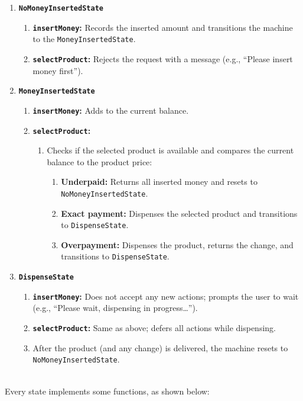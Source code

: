\begin{enumerate}
\item
\protect{}\label{5PvAVXmX5jSML7EurrMjR}
\textbf{\texttt{NoMoneyInsertedState}}

\begin{enumerate}
\item
\textbf{\texttt{insertMoney}:} Records the inserted amount and transitions the machine to the \texttt{MoneyInsertedState}.
\item
\textbf{\texttt{selectProduct}:} Rejects the request with a message (e.g., ``Please insert money first'').
\end{enumerate}
\item
\protect{}\label{r1dhO9ZqJTEp8kVgfl4t2}
\textbf{\texttt{MoneyInsertedState}}

\begin{enumerate}
\item
\textbf{\texttt{insertMoney}:} Adds to the current balance.
\item
\textbf{\texttt{selectProduct}:}

\begin{enumerate}
\item
Checks if the selected product is available and compares the current balance to the product price:

\begin{enumerate}
\item
\textbf{Underpaid:} Returns all inserted money and resets to \texttt{NoMoneyInsertedState}.
\item
\textbf{Exact payment:} Dispenses the selected product and transitions to \texttt{DispenseState}.
\item
\textbf{Overpayment:} Dispenses the product, returns the change, and transitions to \texttt{DispenseState}.
\end{enumerate}
\end{enumerate}
\end{enumerate}
\item
\protect{}\label{qmxNb4aKE3xbjWXRLcNYe}
\textbf{\texttt{DispenseState}}

\begin{enumerate}
\item
\textbf{\texttt{insertMoney}:} Does not accept any new actions; prompts the user to wait (e.g., ``Please wait, dispensing in progress\ldots'').
\item
\textbf{\texttt{selectProduct}:} Same as above; defers all actions while dispensing.
\item
After the product (and any change) is delivered, the machine resets to \texttt{NoMoneyInsertedState}.
\end{enumerate}
\end{enumerate}
\\
Every state implements some functions, as shown below:

